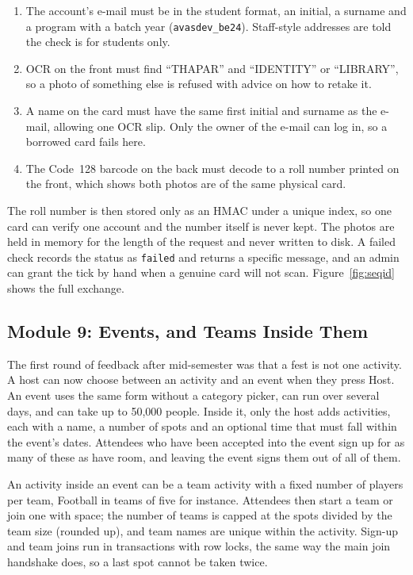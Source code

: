 \documentclass{tietreport}
\begin{document}
\begin{enumerate}[nosep]
  \item The account's e-mail must be in the student format, an initial, a surname and a
        program with a batch year (\texttt{avasdev\_be24}). Staff-style addresses are told
        the check is for students only.
  \item OCR on the front must find ``THAPAR'' and ``IDENTITY'' or ``LIBRARY'', so a photo
        of something else is refused with advice on how to retake it.
  \item A name on the card must have the same first initial and surname as the e-mail,
        allowing one OCR slip. Only the owner of the e-mail can log in, so a borrowed card
        fails here.
  \item The Code~128 barcode on the back must decode to a roll number printed on the
        front, which shows both photos are of the same physical card.
\end{enumerate}

\noindent The roll number is then stored only as an HMAC under a unique index, so one card
can verify one account and the number itself is never kept. The photos are held in memory
for the length of the request and never written to disk. A failed check records the status
as \texttt{failed} and returns a specific message, and an admin can grant the tick by hand
when a genuine card will not scan. Figure~\ref{fig:seqid} shows the full exchange.

\subsection{Module 9: Events, and Teams Inside Them}

The first round of feedback after mid-semester was that a fest is not one activity. A
host can now choose between an activity and an event when they press Host. An event uses
the same form without a category picker, can run over several days, and can take up to
50{,}000 people. Inside it, only the host adds activities, each with a name, a number of
spots and an optional time that must fall within the event's dates. Attendees who have been
accepted into the event sign up for as many of these as have room, and leaving the event
signs them out of all of them.

An activity inside an event can be a team activity with a fixed number of players per
team, Football in teams of five for instance. Attendees then start a team or join one with
space; the number of teams is capped at the spots divided by the team size (rounded up), and team names
are unique within the activity. Sign-up and team joins run in transactions with row locks,
the same way the main join handshake does, so a last spot cannot be taken twice.
\end{document}
